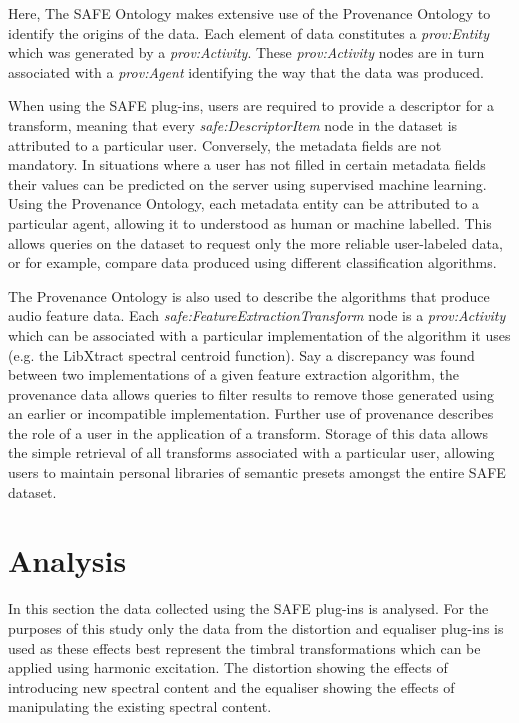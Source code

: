 		Here, The SAFE Ontology makes extensive use of the Provenance Ontology to identify the origins of the data.
		Each element of data constitutes a \emph{prov:Entity} which was generated by a \emph{prov:Activity}. These
		\emph{prov:Activity} nodes are in turn associated with a \emph{prov:Agent} identifying the way that the data
		was produced.

		When using the SAFE plug-ins, users are required to provide a descriptor for a transform, meaning that every
		\emph{safe:DescriptorItem} node in the dataset is attributed to a particular user. Conversely, the metadata
		fields are not mandatory. In situations where a user has not filled in certain metadata fields their values
		can be predicted on the server using supervised machine learning. Using the Provenance Ontology, each
		metadata entity can be attributed to a particular agent, allowing it to understood as human or machine
		labelled. This allows queries on the dataset to request only the more reliable user-labeled data, or for
		example, compare data produced using different classification algorithms.

		The Provenance Ontology is also used to describe the algorithms that produce audio feature data. Each
		\emph{safe:FeatureExtractionTransform} node is a \emph{prov:Activity} which can be associated with a
		particular implementation of the algorithm it uses (e.g. the LibXtract \citep{bullock2007libxtract} spectral
		centroid function). Say a discrepancy was found between two implementations of a given feature extraction
		algorithm, the provenance data allows queries to filter results to remove those generated using an earlier
		or incompatible implementation. Further use of provenance describes the role of a user in the application of
		a transform. Storage of this data allows the simple retrieval of all transforms associated with a particular
		user, allowing users to maintain personal libraries of semantic presets amongst the entire SAFE dataset.

\section{Analysis}
\label{sec:TimbreEvaluation-Analysis}
	In this section the data collected using the SAFE plug-ins is analysed. For the purposes of this study only the data
	from the distortion and equaliser plug-ins is used as these effects best represent the timbral transformations which
	can be applied using harmonic excitation. The distortion showing the effects of introducing new spectral content and
	the equaliser showing the effects of manipulating the existing spectral content.


